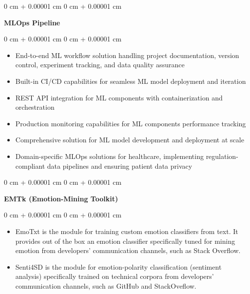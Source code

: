 \documentclass[10pt, a4paper]{article}
\newenvironment{highlights}{
    \begin{itemize}[
        topsep=0.10 cm,
        parsep=0.10 cm,
        partopsep=0pt,
        itemsep=0pt,
        leftmargin=0 cm + 10pt
    ]
}{
    \end{itemize}
} %
\newenvironment{onecolentry}{
    \begin{adjustwidth}{
        0 cm + 0.00001 cm
    }{
        0 cm + 0.00001 cm
    }
}{
    \end{adjustwidth}
} %
\newenvironment{twocolentry}[2][]{
    \onecolentry
    \def\secondColumn{#2}
    \setcolumnwidth{\fill, 4.5 cm}
    \begin{paracol}{2}
}{
    \switchcolumn \raggedleft \secondColumn
    \end{paracol}
    \endonecolentry
} %
\let\hrefWithoutArrow\href
\renewcommand{\href}[2]{\hrefWithoutArrow{#1}{\ifthenelse{\equal{#2}{}}{ }{#2 }\raisebox{.15ex}{\footnotesize \faExternalLink*}}}
\begin{document}
        \vspace{0.2 cm}

        \begin{onecolentry}
            \textbf{MLOps Pipeline}\end{onecolentry}

        \vspace{0.10 cm}
        \begin{onecolentry}
            \begin{highlights}
                \item End-to-end ML workflow solution handling project documentation, version control, experiment tracking, and data quality assurance
                \item Built-in CI/CD capabilities for seamless ML model deployment and iteration
                \item REST API integration for ML components with containerization and orchestration
                \item Production monitoring capabilities for ML components performance tracking
                \item Comprehensive solution for ML model development and deployment at scale
                \item Domain-specific MLOps solutions for healthcare, implementing regulation-compliant data pipelines and ensuring patient data privacy
            \end{highlights}
        \end{onecolentry}


        \vspace{0.2 cm}

        \begin{twocolentry}{
            \href{https://github.com/collab-uniba/EMTk}{EMTk on GitHub}
        }
            \textbf{EMTk (Emotion-Mining Toolkit)}\end{twocolentry}

        \vspace{0.10 cm}
        \begin{onecolentry}
            \begin{highlights}
                \item EmoTxt is the module for training custom emotion classifiers from text. It provides out of the box an emotion classifier specifically tuned for mining emotion from developers' communication channels, such as Stack Overflow.
                \item Senti4SD is the module for emotion-polarity classification (sentiment analysis) specifically trained on technical corpora from developers' communication channels, such as GitHub and StackOveflow.
            \end{highlights}
        \end{onecolentry}



    
\end{document}
